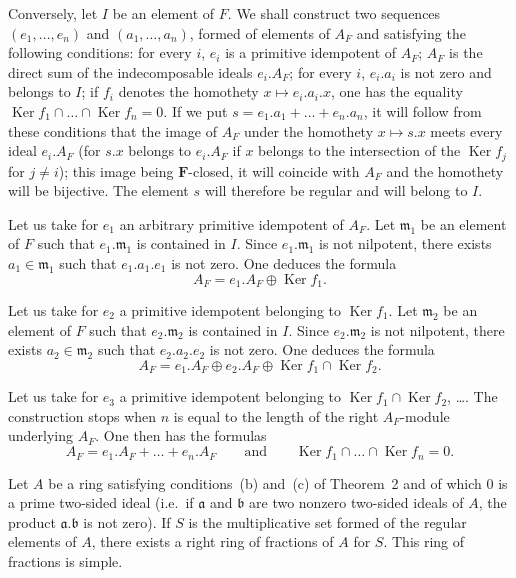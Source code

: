 Conversely, let $I$ be an element of $F$. We shall construct two
sequences $(e_1,\dots,e_n)$ and $(a_1,\dots,a_n)$, formed of elements of
$A_F$ and satisfying the following conditions: for every $i$, $e_i$ is
a primitive idempotent of $A_F$; $A_F$ is the direct sum of the
indecomposable ideals $e_i.A_F$; for every $i$, $e_i.a_i$ is not zero
and belongs to $I$; if $f_i$ denotes the homothety
$x\mapsto e_i.a_i.x$, one has the equality
$\operatorname{Ker}f_1\cap\dots\cap\operatorname{Ker}f_n=0$. If we put
$s=e_1.a_1+\dots+e_n.a_n$, it will follow from these conditions that the
image of $A_F$ under the homothety $x\mapsto s.x$ meets every ideal
$e_i.A_F$ (for $s.x$ belongs to $e_i.A_F$ if $x$ belongs to the
intersection of the $\operatorname{Ker}f_j$ for $j\ne i$); this image
being $\mathbf{F}$-closed, it will coincide with $A_F$ and the
homothety will be bijective. The element $s$ will therefore be regular
and will belong to $I$.

Let us take for $e_1$ an arbitrary primitive idempotent of $A_F$. Let
$\mathfrak{m}_1$ be an element of $F$ such that $e_1.\mathfrak{m}_1$ is
contained in $I$. Since $e_1.\mathfrak{m}_1$ is not nilpotent, there
exists $a_1\in\mathfrak{m}_1$ such that $e_1.a_1.e_1$ is not zero. One
deduces the formula
\[
A_F=e_1.A_F\oplus\operatorname{Ker}f_1.
\]

Let us take for $e_2$ a primitive idempotent belonging to
$\operatorname{Ker}f_1$. Let $\mathfrak{m}_2$ be an element of $F$ such
that $e_2.\mathfrak{m}_2$ is contained in $I$. Since
$e_2.\mathfrak{m}_2$ is not nilpotent, there exists
$a_2\in\mathfrak{m}_2$ such that $e_2.a_2.e_2$ is not zero. One deduces
the formula
\[
A_F=e_1.A_F\oplus e_2.A_F\oplus
\operatorname{Ker}f_1\cap\operatorname{Ker}f_2.
\]

Let us take for $e_3$ a primitive idempotent belonging to
$\operatorname{Ker}f_1\cap\operatorname{Ker}f_2$, \dots. The construction
stops when $n$ is equal to the length of the right $A_F$-module
underlying $A_F$. One then has the formulas
\[
A_F=e_1.A_F+\dots+e_n.A_F\qquad\text{and}\qquad
\operatorname{Ker}f_1\cap\dots\cap\operatorname{Ker}f_n=0.
\]

\begin{corollary}
Let $A$ be a ring satisfying conditions~(b) and~(c) of Theorem~2 and of
which $0$ is a prime two-sided ideal (i.e.\ if $\mathfrak{a}$ and
$\mathfrak{b}$ are two nonzero two-sided ideals of $A$, the product
$\mathfrak{a}.\mathfrak{b}$ is not zero). If $S$ is the multiplicative
set formed of the regular elements of $A$, there exists a right ring of
fractions of $A$ for $S$. This ring of fractions is simple.
\end{corollary}

